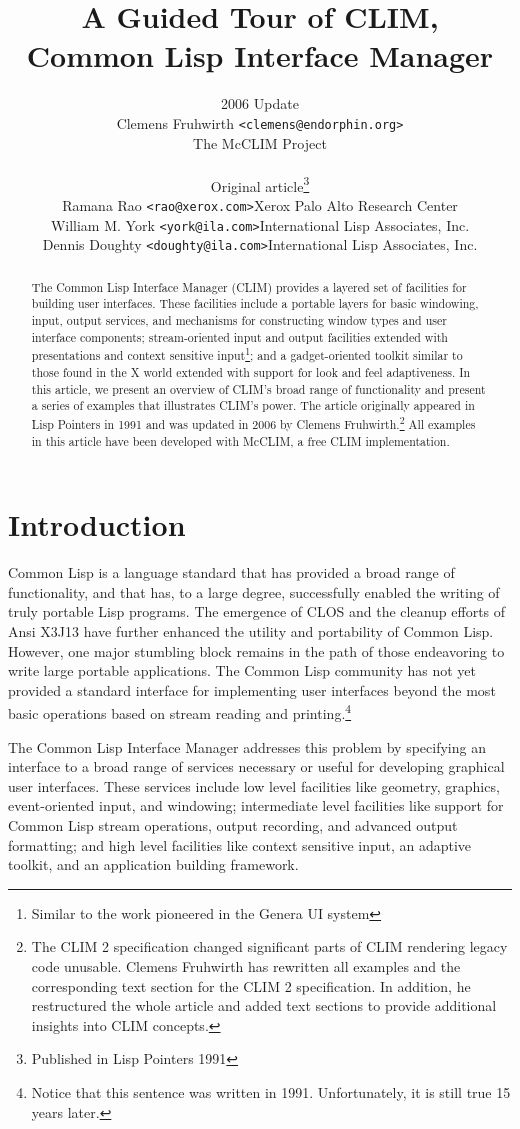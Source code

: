 \documentclass[twocolumn,a4paper]{article}
\title{\Huge A Guided Tour of CLIM, \\ Common Lisp Interface Manager}
\author{
2006 Update \\ 
Clemens Fruhwirth \texttt{<clemens@endorphin.org>} \\ The McCLIM Project 
\bigskip \\
\begin{tabular}{ll}
\multicolumn{2}{c}{Original article\footnote{Published in Lisp Pointers 1991}} \\ 
Ramana Rao \texttt{<rao@xerox.com>} &  Xerox Palo Alto Research Center \\
William M. York \texttt{<york@ila.com>} & International Lisp Associates, Inc. \\
Dennis Doughty \texttt{<doughty@ila.com>} &  International Lisp Associates, Inc. \end{tabular}
}
\newcommand {\CLIM}{{\small CLIM}}
\begin{document}
\maketitle
\begin{abstract}
\noindent The Common Lisp Interface Manager (\CLIM{}) provides a layered set of facilities for building user interfaces. These facilities include a portable layers for basic windowing, input, output services, and mechanisms for constructing window types and user interface components; stream-oriented input and output facilities extended with presentations and context sensitive input\footnote{Similar to the work pioneered in the Genera UI system}; and a gadget-oriented toolkit similar to those found in the X world extended with support for look and feel adaptiveness. In this article, we present an overview of \CLIM{}'s broad range of functionality and present a series of examples that illustrates \CLIM{}'s power. The article originally appeared in Lisp Pointers in 1991 and was updated in 2006 by Clemens Fruhwirth.\footnote{The CLIM 2 specification changed significant parts of \CLIM{} rendering legacy code unusable. Clemens Fruhwirth has rewritten all examples and the corresponding text section for the \CLIM{} 2 specification. In addition, he restructured the whole article and added text sections to provide additional insights into \CLIM{} concepts.} All examples in this article have been developed with McCLIM{}\cite{mcclim}, a free \CLIM{} implementation.
\end{abstract}

\section*{Introduction}
Common Lisp is a language standard that has provided a broad range of functionality, and that has, to a large degree, successfully enabled the writing of truly portable Lisp programs. The emergence of CLOS and the cleanup efforts of Ansi X3J13 have further enhanced the utility and portability of Common Lisp. However, one major stumbling block remains in the path of those endeavoring to write large portable applications. The Common Lisp community has not yet provided a standard interface for implementing user interfaces beyond the most basic operations based on stream reading and printing.\footnote{Notice that this sentence was written in 1991. Unfortunately, it is still true 15 years later.}

The Common Lisp Interface Manager addresses this problem by specifying an interface to a broad range of services necessary or useful for developing graphical user interfaces. These services include low level facilities like geometry, graphics, event-oriented input, and windowing; intermediate level facilities like support for Common Lisp stream operations, output recording, and advanced output formatting; and high level facilities like context sensitive input, an adaptive toolkit, and an application building framework.
\end{document}
